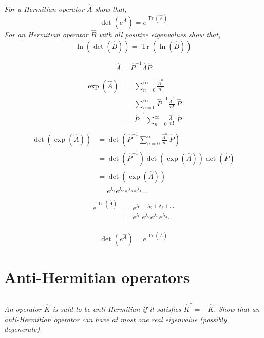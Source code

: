 \documentclass[12pt, letterpaper]{article}
\begin{document}
\subsection{}
\textit{For a Hermitian operator $\hat{A}$ show that,
$$
\operatorname{det}\left(e^{\hat{A}}\right)=e^{\operatorname{Tr}(\hat{A})}
$$
For an Hermitian operator $\hat{B}$ with all positive eigenvalues show that,
$$
\ln (\operatorname{det}(\hat{B}))=\operatorname{Tr}(\ln (\hat{B}))
$$
}

$$
\hat A = \hat{P}^{-1} \hat \Lambda \hat P
$$

\begin{align*}
    \exp\left(\hat A\right) & = \sum_{n=0}^\infty \frac{\hat{A}^n} {n!} \\ 
    &= \sum_{n=0}^\infty  \hat{P}^{-1} \frac{\hat{\Lambda}^n} {n!}\, \hat{P}\\
    &= \hat{P}^{-1} \sum_{n=0}^\infty  \frac{\hat{\Lambda}^n} {n!}\, \hat{P}\\
\end{align*}
\begin{align*}
    \operatorname{det}\left(\exp\left(\hat A\right) \right)&= \operatorname{det}\left(\hat{P}^{-1} \sum_{n=0}^\infty  \frac{\hat{\Lambda}^n} {n!}\, \hat{P} \right)\\
    &= \operatorname{det}\left(\hat{P}^{-1}\right)\operatorname{det}\left(\exp\left(\hat \Lambda\right)\right)\operatorname{det}\left(\hat{P}\right)\\
    &= \operatorname{det}\left(\exp\left(\hat \Lambda\right)\right)\\
    &= e^{\lambda_1}e^{\lambda_2}e^{\lambda_3}e^{\lambda_4}\ldots\\
\end{align*}
\begin{align*}
    e^{\operatorname{Tr} \left(\hat A\right)}&=e^{\lambda_1+\lambda_2+\lambda_3+\ldots} \\
    &= e^{\lambda_1}e^{\lambda_2}e^{\lambda_3}e^{\lambda_4}\ldots\\
\end{align*}

\begin{equation*}
    \operatorname{det}\left(e^{\hat{A}}\right)=e^{\operatorname{Tr}(\hat{A})}
\end{equation*}

\section{Anti-Hermitian operators}
\subsection{}
\textit{An operator $\hat{K}$ is said to be anti-Hermitian if it satisfies $\hat{K}^{\dagger}=-\hat{K}$. Show that an anti-Hermitian operator can have at most one real eigenvalue (possibly degenerate).}
\end{document}
